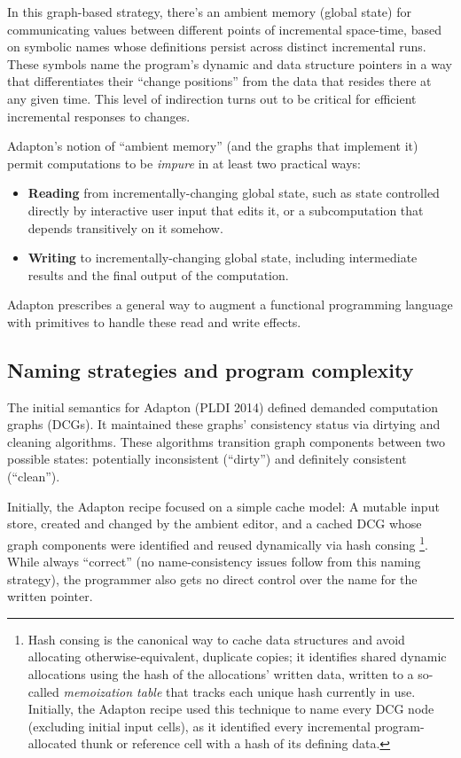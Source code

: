 \documentclass[11pt]{article}
\begin{document}
In this graph-based strategy, there's an ambient memory (global state)
for communicating values between different points of incremental
space-time, based on symbolic names whose definitions persist across
distinct incremental runs.
%
These symbols name the program's dynamic and data structure pointers
in a way that differentiates their ``change positions'' from the data
that resides there at any given time.
%
This level of indirection turns out to be critical for efficient
incremental responses to changes.

Adapton's notion of ``ambient memory'' (and the graphs that implement
it) permit computations to be \emph{impure} in at least two practical
ways:

\begin{itemize}

\item \textbf{Reading} from incrementally-changing global state, such as state controlled directly by interactive user input that edits it, or a subcomputation that depends transitively on it somehow.
  
\item \textbf{Writing} to incrementally-changing global state, including intermediate results and the final output of the computation.

\end{itemize}

Adapton prescribes a general way to augment a functional
programming language with primitives to handle these read and write effects.

\subsection{Naming strategies and program complexity}

The initial semantics for Adapton (PLDI 2014) defined demanded
computation graphs (DCGs).  It maintained these graphs' consistency
status via dirtying and cleaning algorithms.  These algorithms
transition graph components between two possible states: potentially
inconsistent (``dirty'') and definitely consistent (``clean'').

Initially, the Adapton recipe focused on a simple cache model: A mutable
input store, created and changed by the ambient editor, and a cached DCG
whose graph components were identified and reused dynamically via hash
consing
%
\footnote{
%
%
Hash consing is the canonical way to cache data structures and avoid
allocating otherwise-equivalent, duplicate copies; it identifies shared dynamic
allocations using the hash of the allocations' written data, written
to a so-called \emph{memoization table} that tracks each unique hash
currently in use.  Initially, the Adapton recipe used this technique
to name every DCG node (excluding initial input cells), as it
identified every incremental program-allocated thunk or reference cell
with a hash of its defining data.
%
}.
%
While always ``correct'' (no name-consistency issues follow from this
naming strategy), the programmer also gets no direct control over the
name for the written pointer.
\end{document}

